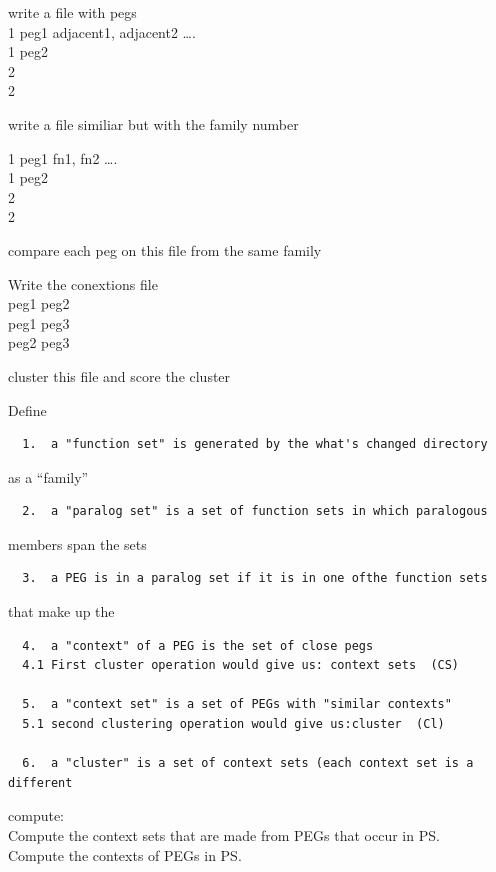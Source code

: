 \documentclass[12pt,twoside]{reedthesis}
\begin{document}
  write a file with pegs\\
  1 peg1 adjacent1, adjacent2 \ldots{}.\\
  1 peg2\\
  2\\
  2
  
  write a file similiar but with the family number
  
  1 peg1 fn1, fn2 \ldots{}.\\
  1 peg2\\
  2\\
  2
  
  compare each peg on this file from the same family
  
  Write the conextions file\\
  peg1 peg2\\
  peg1 peg3\\
  peg2 peg3
  
  cluster this file and score the cluster
  
  Define
  
  \begin{verbatim}
  1.  a "function set" is generated by the what's changed directory  
  \end{verbatim}
  
  as a ``family''
  
  \begin{verbatim}
  2.  a "paralog set" is a set of function sets in which paralogous  
  \end{verbatim}
  
  members span the sets
  
  \begin{verbatim}
  3.  a PEG is in a paralog set if it is in one ofthe function sets  
  \end{verbatim}
  
  that make up the
  
  \begin{verbatim}
  4.  a "context" of a PEG is the set of close pegs  
  4.1 First cluster operation would give us: context sets  (CS)  
  
  5.  a "context set" is a set of PEGs with "similar contexts"  
  5.1 second clustering operation would give us:cluster  (Cl)  
  
  6.  a "cluster" is a set of context sets (each context set is a different   
  \end{verbatim}
  
  compute:\\
  Compute the context sets that are made from PEGs that occur in PS.\\
  Compute the contexts of PEGs in PS.
  
\end{document}
